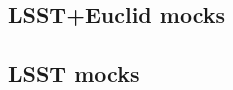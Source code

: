 \documentclass[\docopts]{\docclass}
\begin{document}
\subsection{LSST+Euclid mocks}
\label{sec:mg}



\subsection{LSST mocks}
\label{sec:ss}











\end{document}

